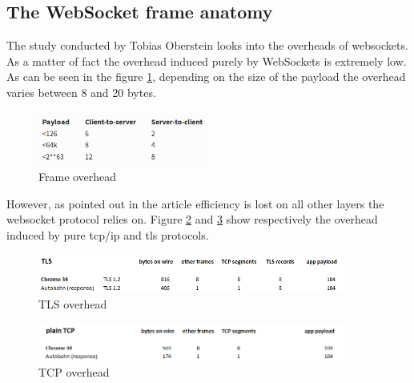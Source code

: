 \subsection{The WebSocket frame anatomy}

The study conducted by Tobias Oberstein \citep{Reference30} looks into the overheads of websockets. As a matter of fact the overhead induced purely by WebSockets is extremely low. As can be seen in the figure \ref{fig:frame_overhead}, depending on the size of the payload the overhead varies between 8 and 20 bytes.\\

\begin{figure}[htbp]
	\centering
		\includegraphics[width=0.5\textwidth]{./Figures/frame_overhead.png}
	\caption[frame_overhead]{Frame overhead \citep{Reference30}}
	\label{fig:frame_overhead}
\end{figure}


However, as pointed out in the article efficiency is lost on all other layers the websocket protocol relies on. Figure \ref{fig:tls_overhead} and \ref{fig:tcp_overhead} show respectively the overhead induced by pure tcp/ip and tls protocols.\\

\begin{figure}[htbp]
	\centering
		\includegraphics[width=0.9\textwidth]{./Figures/tls_overhead.png}
	\caption[tls_overhead]{TLS overhead \citep{Reference30}}
	\label{fig:tls_overhead}
\end{figure}

\begin{figure}[htbp]
	\centering
		\includegraphics[width=0.9\textwidth]{./Figures/tcp_overhead.png}
	\caption[tcp_overhead]{TCP overhead \citep{Reference30}}
	\label{fig:tcp_overhead}
\end{figure}



